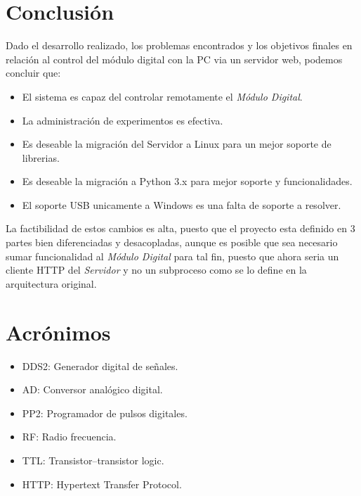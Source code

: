 \section{Conclusi\'on}

Dado el desarrollo realizado, los problemas encontrados y los objetivos finales en relaci\'on
al control del m\'odulo digital con la PC via un servidor web, podemos concluir que:

\begin{itemize}
    \item El sistema es capaz del controlar remotamente el \textit{M\'odulo Digital}.
    \item La administraci\'on de experimentos es efectiva.
    \item Es deseable la migraci\'on del Servidor a Linux para un mejor soporte de librerias.
    \item Es deseable la migraci\'on a Python 3.x para mejor soporte y funcionalidades.
    \item El soporte USB unicamente a Windows es una falta de soporte a resolver.
\end{itemize}

La factibilidad de estos cambios es alta, puesto que el proyecto esta definido en 3 partes
bien diferenciadas y desacopladas, aunque es posible que sea necesario sumar funcionalidad 
al \textit{M\'odulo Digital} para tal fin, puesto que ahora seria un cliente HTTP del \textit{Servidor} y
no un subproceso como se lo define en la arquitectura original.

\newpage

\section{Acr\'onimos}

\begin{itemize}
    \item DDS2: Generador digital de se\~nales.
    \item AD: Conversor anal\'ogico digital.
    \item PP2: Programador de pulsos digitales.
    \item RF: Radio frecuencia.
    \item TTL: Transistor–transistor logic.
    \item HTTP: Hypertext Transfer Protocol.
\end{itemize}

\newpage